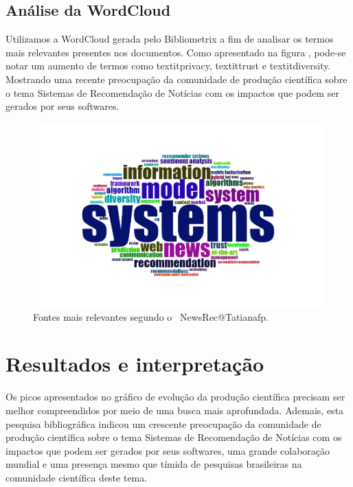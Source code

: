 \subsection{Análise da WordCloud }

Utilizamos a WordCloud gerada pelo Bibliometrix a fim de analisar os termos mais relevantes presentes nos documentos. Como apresentado na figura , pode-se notar um aumento de termos como textit{privacy}, textit{trust} e textit{diversity}. Mostrando uma recente preocupação da comunidade de produção científica  sobre o tema Sistemas de Recomendação de Notícias com os impactos que podem ser gerados por seus softwares. 

\begin{figure}
    \centering
    \includegraphics[width=1\textwidth]{experiments/Tatianafp/PesquisaBibliometrica/images/WordCloudDocuments.png}
    \caption{Fontes mais relevantes segundo o \dataset\ NewsRec@Tatianafp.}
    \label{fig:wordloud_NewsRec_Tatianafp}
\end{figure}

\section{Resultados e interpretação}

Os picos apresentados no gráfico de evolução da produção científica precisam ser melhor compreendidos por meio de uma busca mais aprofundada. Ademais, esta pesquisa bibliográfica indicou um crescente preocupação da comunidade de produção científica  sobre o tema Sistemas de Recomendação de Notícias com os impactos que podem ser gerados por seus softwares, uma grande colaboração mundial e uma presença mesmo que tímida de pesquisas brasileiras na comunidade científica deste tema. 